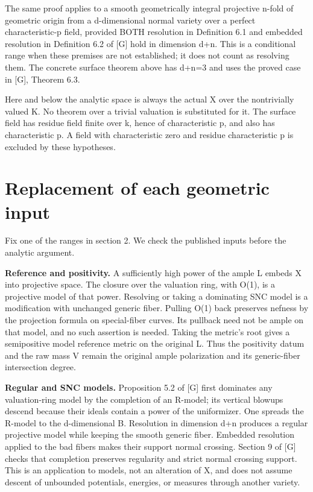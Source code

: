 \documentclass[11pt]{article}
\begin{document}
The same proof applies to a smooth geometrically integral projective n-fold of geometric origin from a d-dimensional normal variety over a perfect characteristic-p field, provided BOTH resolution in Definition 6.1 and embedded resolution in Definition 6.2 of [G] hold in dimension d+n. This is a conditional range when these premises are not established; it does not count as resolving them. The concrete surface theorem above has d+n=3 and uses the proved case in [G], Theorem 6.3.

Here and below the analytic space is always the actual X over the nontrivially valued K. No theorem over a trivial valuation is substituted for it. The surface field has residue field finite over k, hence of characteristic p, and also has characteristic p. A field with characteristic zero and residue characteristic p is excluded by these hypotheses.

\section{Replacement of each geometric input}

Fix one of the ranges in section 2. We check the published inputs before the analytic argument.

\textbf{Reference and positivity.} A sufficiently high power of the ample L embeds X into projective space. The closure over the valuation ring, with O(1), is a projective model of that power. Resolving or taking a dominating SNC model is a modification with unchanged generic fiber. Pulling O(1) back preserves nefness by the projection formula on special-fiber curves. Its pullback need not be ample on that model, and no such assertion is needed. Taking the metric's root gives a semipositive model reference metric on the original L. Thus the positivity datum and the raw mass V remain the original ample polarization and its generic-fiber intersection degree.

\textbf{Regular and SNC models.} Proposition 5.2 of [G] first dominates any valuation-ring model by the completion of an R-model; its vertical blowups descend because their ideals contain a power of the uniformizer. One spreads the R-model to the d-dimensional B. Resolution in dimension d+n produces a regular projective model while keeping the smooth generic fiber. Embedded resolution applied to the bad fibers makes their support normal crossing. Section 9 of [G] checks that completion preserves regularity and strict normal crossing support. This is an application to models, not an alteration of X, and does not assume descent of unbounded potentials, energies, or measures through another variety.
\end{document}
